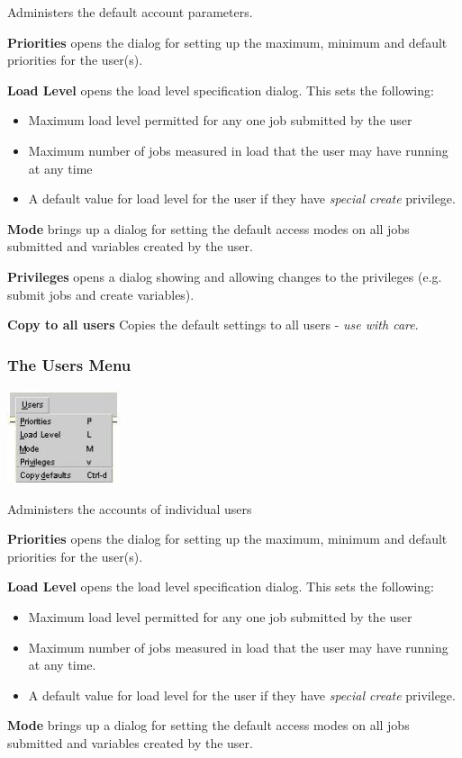 Administers the default account parameters.

\textbf{Priorities} opens the dialog for setting up the maximum, minimum and default priorities for the user(s).

\textbf{Load Level} opens the load level specification dialog. This sets the following:

\begin{itemize}
\item Maximum load level permitted for any one job submitted by the user
\item Maximum number of jobs measured in load that the user may have running at any time
\item A default value for load level for the user if they have \textit{special create} privilege.
\end{itemize}
\textbf{Mode} brings up a dialog for setting the default access modes on all jobs submitted and variables created by the user.

\textbf{Privileges} opens a dialog showing and allowing changes to the privileges (e.g. submit jobs and create variables).

\textbf{Copy to all users} Copies the default settings to all users - \textit{use with care}.

\subsubsection{The Users Menu}
 \includegraphics[width=3.321cm,height=2.752cm]{img/ref49.jpg} 

Administers the accounts of individual users

\textbf{Priorities} opens the dialog for setting up the maximum, minimum and default priorities for the user(s).

\textbf{Load Level} opens the load level specification dialog. This sets the following:

\begin{itemize}
\item Maximum load level permitted for any one job submitted by the user
\item Maximum number of jobs measured in load that the user may have running at any time.
\item A default value for load level for the user if they have \textit{special create} privilege.
\end{itemize}
\textbf{Mode} brings up a dialog for setting the default access modes on all jobs submitted and variables created by the user.


